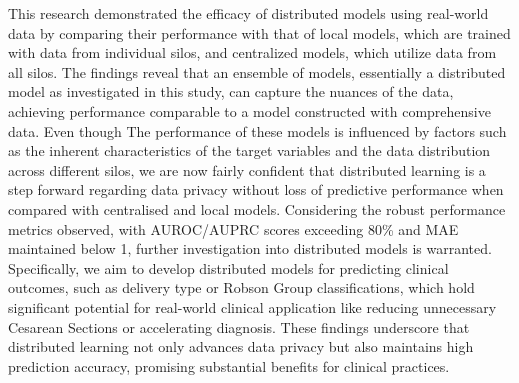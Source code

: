 
This research demonstrated the efficacy of distributed models using real-world data by comparing their performance with that of local models, which are trained with data from individual silos, and centralized models, which utilize data from all silos. The findings reveal that an ensemble of models, essentially a distributed model as investigated in this study, can capture the nuances of the data, achieving performance comparable to a model constructed with comprehensive data. Even though The performance of these models is influenced by factors such as the inherent characteristics of the target variables and the data distribution across different silos, we are now fairly confident that distributed learning is a step forward regarding data privacy without loss of predictive performance when compared with centralised and local models.
Considering the robust performance metrics observed, with AUROC/AUPRC scores exceeding 80\% and MAE maintained below 1, further investigation into distributed models is warranted. Specifically, we aim to develop distributed models for predicting clinical outcomes, such as delivery type or Robson Group classifications, which hold significant potential for real-world clinical application like reducing unnecessary Cesarean Sections or accelerating diagnosis. These findings underscore that distributed learning not only advances data privacy but also maintains high prediction accuracy, promising substantial benefits for clinical practices.
